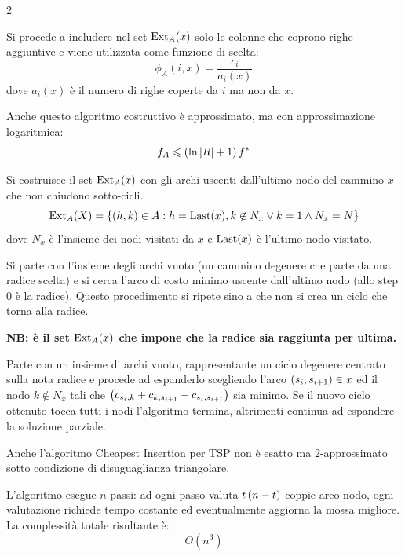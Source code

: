 \documentclass[\main/main.tex]{subfiles}
\begin{document}
\begin{multicols}{2}
\begin{definition}
    Si procede a includere nel set \(\text{Ext}_A(x)\) solo le colonne che coprono righe aggiuntive e viene utilizzata come funzione di scelta:
    \[
        \phi_A(i, x) = \frac{c_i}{a_i(x)}
    \]
    dove \(a_i(x)\) è il numero di righe coperte da \(i\) ma non da \(x\).
\end{definition}
\begin{observation}
    Anche questo algoritmo costruttivo è approssimato, ma con approssimazione logaritmica:
    \[
        f_A \leqslant \left(\ln\left\lvert R\right\rvert+1\right) f^*
    \]
\end{observation}
\begin{definition}
    Si costruisce il set \(\text{Ext}_A(x)\) con gli archi uscenti dall'ultimo nodo del cammino \(x\) che non chiudono sotto-cicli.
    \[
        \text{Ext}_A(X) = \left\{\left(h,k\right) \in A: h = \text{Last}(x), k \not\in N_x \lor k=1  \land  N_x = N\right\}
    \]
    dove \(N_x\) è l'insieme dei nodi visitati da \(x\) e \(\text{Last}(x)\) è l'ultimo nodo visitato.
    
    Si parte con l'insieme degli archi vuoto (un cammino degenere che parte da una radice scelta) e si cerca l'arco di costo minimo uscente dall'ultimo nodo (allo step \(0\) è la radice). Questo procedimento si ripete sino a che non si crea un ciclo che torna alla radice.
    
    \textbf{NB: è il set \(\text{Ext}_A(x)\) che impone che la radice sia raggiunta per ultima.}
\end{definition}
\begin{definition}
    Parte con un insieme di archi vuoto, rappresentante un ciclo degenere centrato sulla nota radice e procede ad espanderlo scegliendo l'arco \(\left(s_i, s_{i+1}\right) \in x\) ed il nodo \(k \not\in N_x\) tali che \(\left(c_{s_i, k} + c_{k, s_{i+1}} - c_{s_i, s_{i+1}}\right)\) sia minimo. Se il nuovo ciclo ottenuto tocca tutti i nodi l'algoritmo termina, altrimenti continua ad espandere la soluzione parziale.
\end{definition}
\begin{observation}
    Anche l'algoritmo Cheapest Insertion per TSP non è esatto ma \(2\)-approssimato sotto condizione di disuguaglianza triangolare.
\end{observation}
\begin{complexity}
    L'algoritmo esegue \(n\) passi: ad ogni passo valuta \(t\left(n-t\right)\) coppie arco-nodo, ogni valutazione richiede tempo costante ed eventualmente aggiorna la mossa migliore. La complessità totale risultante è:
    \[
        \Theta(n^3)
    \]
    

\end{complexity}
\end{multicols}
\end{document}
